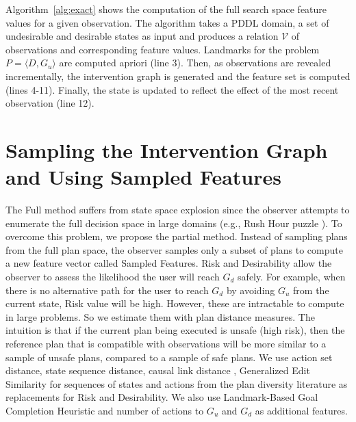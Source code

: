 \documentclass[letterpaper]{article}
\theoremstyle{plain}
\begin{document}
Algorithm~\ref{alg:exact} shows the computation of the full search space feature values for a given observation. The algorithm takes a PDDL domain, a set of undesirable and desirable states as input and produces a relation $\mathcal{V}$ of observations and corresponding feature values. Landmarks for the problem $P = \langle D, G_u\rangle$ are computed apriori (line 3). Then, as observations are revealed incrementally, the intervention graph is generated and the feature set is computed (lines 4-11). Finally, the state is updated to reflect the effect of the most recent observation (line 12).

\section{Sampling the Intervention Graph and Using Sampled Features}
The Full method suffers from state space explosion since the observer attempts to enumerate the full decision space in large domains (e.g., Rush Hour puzzle \cite{fernau2003}). To overcome this problem, we propose the partial method. Instead of sampling plans from the full plan space, the observer samples only a subset of plans to compute a new feature vector called Sampled Features.
Risk and Desirability allow the observer to assess the likelihood the user will reach $G_d$ safely. For example, when there is no alternative path for the user to reach $G_d$ by avoiding $G_u$ from the current state, Risk value will be high. However, these are intractable to compute in large problems. So we estimate them with plan distance measures. The intuition is that if the current plan being executed is unsafe (high risk), then the reference plan that is compatible with observations will be more similar to a sample of unsafe plans, compared to a sample of safe plans. We use action set distance, state sequence distance, causal link distance \cite{nguyen2012generating}, Generalized Edit Similarity for sequences of states and actions \cite{sohrabi2016finding} from the plan diversity literature as replacements for Risk and Desirability. We also use Landmark-Based Goal Completion Heuristic \cite{pereira2017} and number of actions to $G_u$ and $G_d$ as additional features.
\end{document}
